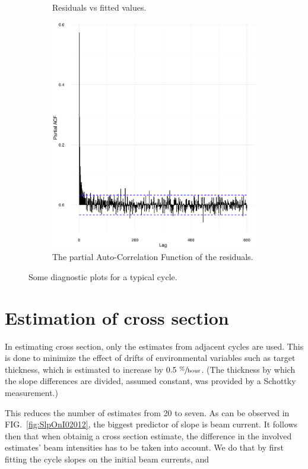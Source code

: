 \documentclass[reprint]{revtex4-1}
\newcommand{\scl}{.4}
\begin{document}
\begin{figure}
\begin{subfigure}{.5\textwidth}
\caption{Residuals vs fitted values.}
\end{subfigure}
\begin{subfigure}{.5\textwidth}
\includegraphics[scale=\scl]{img/Run969_residual_PACF.eps}
\caption{The partial Auto-Correlation Function of the residuals.}
\end{subfigure}
\caption{Some diagnostic plots for a typical cycle.\label{fig:Run969}}
\end{figure}

\section{Estimation of cross section}

In estimating cross section, only the estimates from adjacent cycles are used. This is done to minimize the effect of drifts of environmental variables such as target thickness, which is estimated to increase by $0.5~ \sfrac{\%}{\mathrm{hour}}$. (The thickness by which the slope differences are divided, assumed constant, was provided by a Schottky measurement.)

This reduces the number of estimates from 20 to seven. As can be observed in FIG.~\ref{fig:SlpOnI02012}, the biggest predictor of slope is beam current. It follows then that when obtainig a cross section estimate, the difference in the involved estimates' beam intensities has to be taken into account. We do that by first fitting the cycle slopes on the initial beam currents, and 
\end{document}

